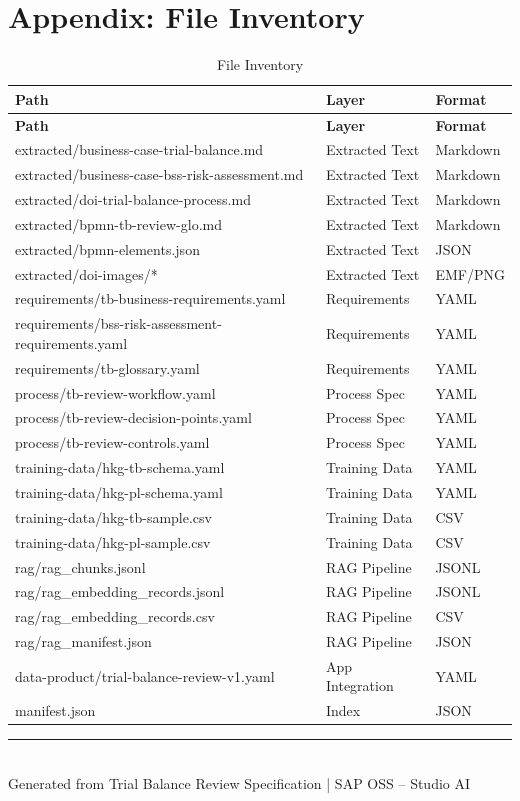 \documentclass[11pt,a4paper]{article}
\begin{document}

\newpage
\section*{Appendix: File Inventory}

\begin{longtable}{@{}L{7.5cm}L{3cm}C{3cm}@{}}
\caption{File Inventory} \\
\toprule
\textbf{Path} & \textbf{Layer} & \textbf{Format} \\
\midrule
\endfirsthead
\toprule
\textbf{Path} & \textbf{Layer} & \textbf{Format} \\
\midrule
\endhead
extracted/business-case-trial-balance.md & Extracted Text & Markdown \\
extracted/business-case-bss-risk-assessment.md & Extracted Text & Markdown \\
extracted/doi-trial-balance-process.md & Extracted Text & Markdown \\
extracted/bpmn-tb-review-glo.md & Extracted Text & Markdown \\
extracted/bpmn-elements.json & Extracted Text & JSON \\
extracted/doi-images/* & Extracted Text & EMF/PNG \\
requirements/tb-business-requirements.yaml & Requirements & YAML \\
requirements/bss-risk-assessment-requirements.yaml & Requirements & YAML \\
requirements/tb-glossary.yaml & Requirements & YAML \\
process/tb-review-workflow.yaml & Process Spec & YAML \\
process/tb-review-decision-points.yaml & Process Spec & YAML \\
process/tb-review-controls.yaml & Process Spec & YAML \\
training-data/hkg-tb-schema.yaml & Training Data & YAML \\
training-data/hkg-pl-schema.yaml & Training Data & YAML \\
training-data/hkg-tb-sample.csv & Training Data & CSV \\
training-data/hkg-pl-sample.csv & Training Data & CSV \\
rag/rag\_chunks.jsonl & RAG Pipeline & JSONL \\
rag/rag\_embedding\_records.jsonl & RAG Pipeline & JSONL \\
rag/rag\_embedding\_records.csv & RAG Pipeline & CSV \\
rag/rag\_manifest.json & RAG Pipeline & JSON \\
data-product/trial-balance-review-v1.yaml & App Integration & YAML \\
manifest.json & Index & JSON \\
\bottomrule
\end{longtable}

\vfill
\begin{center}
\textcolor{sapblue}{\rule{0.8\textwidth}{0.4pt}}\\[0.5cm]
{\small Generated from Trial Balance Review Specification | SAP OSS -- Studio AI}
\end{center}
\end{document}
